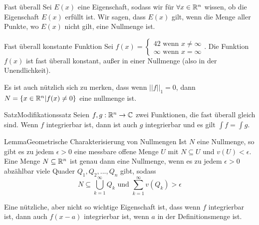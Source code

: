 \begin{Def}{Fast überall}
Sei $E(x)$ eine Eigenschaft, sodass wir für $\forall x \in \mathbb{R}^n$ wissen, ob die Eigenschaft $E(x)$ erfüllt ist. Wir sagen, dass $E(x)$  gilt, wenn die Menge aller Punkte, wo $E(x)$ nicht gilt, eine Nullmenge ist.
\end{Def}
\begin{Beispiel}{Fast überall konstante Funktion}
Sei $f(x)=\begin{cases}42 \mbox{ wenn $x\neq \infty$} \\
\infty \mbox{ wenn $x=\infty$}\end{cases}$. Die Funktion $f(x)$ ist fast überall konstant, außer in einer Nullmenge (also in der Unendlichkeit). 
\end{Beispiel}
Es ist auch nützlich sich zu merken, dass wenn $||f||_1=0$, dann $N=\{ x\in \mathbb{R}^n | f(x)\neq 0\}$ eine nullmenge ist.
\begin{Satz}{Satz}{Modifikationssatz}
Seien $f,g:\mathbb{R}^n\rightarrow \mathbb{C}$ zwei Funktionen, die fast überall gleich sind. Wenn $f$ integrierbar ist, dann ist auch $g$ integrierbar und es gilt $\int f = \int g$.
\end{Satz}
\begin{Satz}{Lemma}{Geometrische Charakterisierung von Nullmengen}
    Ist $N$ eine Nullmenge, so gibt es zu jedem $\epsilon>0$ eine messbare offene Menge $U$ mit $N\subseteq U$ und $v(U)<\epsilon$. \\
    Eine Menge $N\subseteq \mathbb{R}^n$ ist genau dann eine Nullmenge, wenn es zu jedem $\epsilon>0$ abzählbar viele Quader $Q_1, Q_2, ..., Q_n$ gibt, sodass
    $$N\subseteq \bigcup_{k=1}^{\infty}Q_k \mbox{ und }\sum_{k=1}^\infty v(Q_k)>\epsilon$$
\end{Satz}
Eine nützliche, aber nicht so wichtige Eigenschaft ist, dass wenn $f$ integrierbar ist, dann auch $f(x-a)$ integrierbar ist, wenn $a$ in der Definitionsmenge ist.
\newpage
